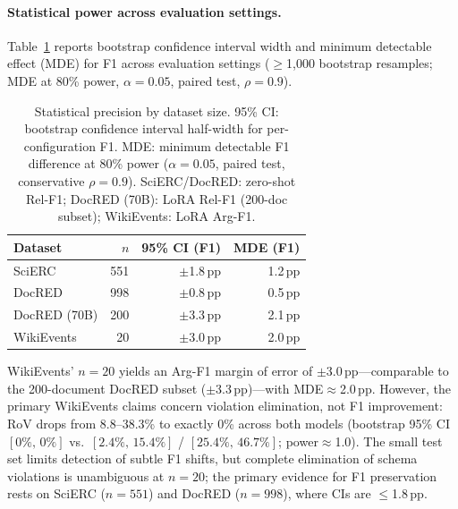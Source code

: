 
\paragraph{Statistical power across evaluation settings.}
\label{app:power-analysis-full}
Table~\ref{tab:power-analysis} reports bootstrap confidence interval width and minimum detectable effect (MDE) for F1 across evaluation settings (${\geq}$1{,}000 bootstrap resamples; MDE at 80\% power, $\alpha{=}0.05$, paired test, $\rho{=}0.9$).

\begin{table}[h]
\centering
\small
\begin{tabular}{lrrr}
\toprule
\textbf{Dataset} & \textbf{$n$} & \textbf{95\% CI (F1)} & \textbf{MDE (F1)} \\
\midrule
SciERC & 551 & $\pm$1.8\,pp & 1.2\,pp \\
DocRED & 998 & $\pm$0.8\,pp & 0.5\,pp \\
DocRED (70B) & 200 & $\pm$3.3\,pp & 2.1\,pp \\
WikiEvents & 20 & $\pm$3.0\,pp & 2.0\,pp \\
\bottomrule
\end{tabular}
\caption{Statistical precision by dataset size.
95\% CI: bootstrap confidence interval half-width for per-configuration F1.
MDE: minimum detectable F1 difference at 80\% power ($\alpha{=}0.05$, paired test, conservative $\rho{=}0.9$).
SciERC/DocRED: zero-shot Rel-F1; DocRED (70B): LoRA Rel-F1 (200-doc subset); WikiEvents: LoRA Arg-F1.}
\label{tab:power-analysis}
\end{table}

WikiEvents' $n{=}20$ yields an Arg-F1 margin of error of $\pm$3.0\,pp---comparable to the 200-document DocRED subset ($\pm$3.3\,pp)---with MDE${\approx}$2.0\,pp.
However, the primary WikiEvents claims concern violation elimination, not F1 improvement: RoV drops from 8.8--38.3\% to exactly 0\% across both models (bootstrap 95\% CI $[0\%,\,0\%]$ vs.\ $[2.4\%,\,15.4\%]$ / $[25.4\%,\,46.7\%]$; power${\approx}$1.0).
The small test set limits detection of subtle F1 shifts, but complete elimination of schema violations is unambiguous at $n{=}20$; the primary evidence for F1 preservation rests on SciERC ($n{=}551$) and DocRED ($n{=}998$), where CIs are ${\leq}$1.8\,pp.
